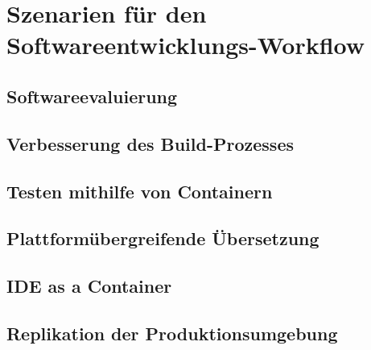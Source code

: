 \chapter{Szenarien für den Softwareentwicklungs-Workflow}
\label{cha:szenarien}
\section{Softwareevaluierung}
\label{sec:softwareevaluierung}
\section{Verbesserung des Build-Prozesses}
\label{sec:build-prozess-verbesserung}
\section{Testen mithilfe von Containern}
\label{sec:containerbasiertes-testen}
\section{Plattformübergreifende Übersetzung}
\label{sec:plattformuebergreifende-uebersetzung}
\section{IDE as a Container}
\label{sec:ideasacontainer}
\section{Replikation der Produktionsumgebung}
\label{sec:replikation-produktionsumgebung}
